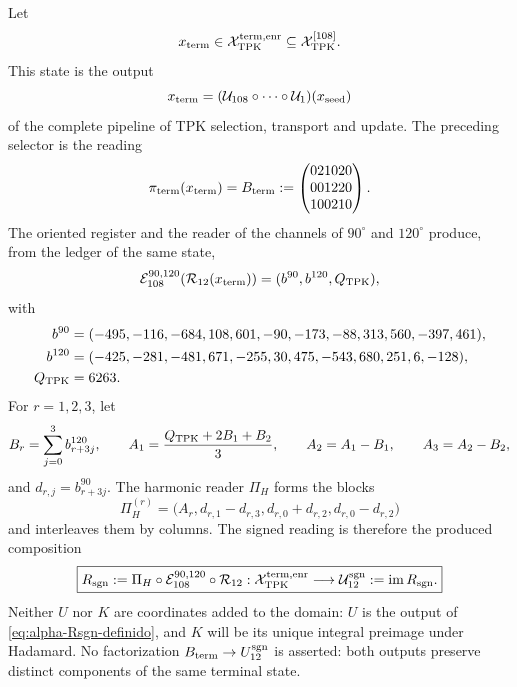 \begin{definition}
Let
\[
 x_{\rm term}\in\mathcal X_{\rm TPK}^{\rm term,enr}
 \subseteq\mathcal X_{\rm TPK}^{[108]}.
\]
This state is the output
\[
 x_{\rm term}
 =(\mathcal U_{108}\circ\cdots\circ\mathcal U_1)(x_{\rm seed})
\]
of the complete pipeline of TPK selection, transport and update.
The preceding selector is the reading
\[
 \pi_{\rm term}(x_{\rm term})
 =B_{\rm term}
 :=\begin{pmatrix}021020\\001220\\100210\end{pmatrix}.
\]
The oriented register and the reader of the channels of \(90^\circ\) and
\(120^\circ\) produce, from the ledger of the same state,
\begin{equation}\label{eq:alpha-subespacio-firmado}
 \mathcal E_{108}^{90,120}\!
 \left(\mathcal R_{12}(x_{\rm term})\right)
 =(b^{90},b^{120},Q_{\rm TPK}),
\end{equation}
with
\[
\begin{aligned}
 b^{90}={}&(-495,-116,-684,108,601,-90,
             -173,-88,313,560,-397,461),\\
 b^{120}={}&(-425,-281,-481,671,-255,30,
              475,-543,680,251,6,-128),\\
 Q_{\rm TPK}={}&6263.
\end{aligned}
\]
For \(r=1,2,3\), let
\[
 B_r=\sum_{j=0}^{3}b^{120}_{r+3j},\qquad
 A_1=\frac{Q_{\rm TPK}+2B_1+B_2}{3},\qquad
 A_2=A_1-B_1,\qquad A_3=A_2-B_2,
\]
and \(d_{r,j}=b^{90}_{r+3j}\). The harmonic reader \(\Pi_H\) forms the
blocks
\begin{equation}\label{eq:alpha-modulo-imagen-H12}
 \Pi_H^{(r)}
 =\bigl(A_r,d_{r,1}-d_{r,3},
              d_{r,0}+d_{r,2},d_{r,0}-d_{r,2}\bigr)
\end{equation}
and interleaves them by columns. The signed reading is therefore the
produced composition
\begin{equation}\label{eq:alpha-Rsgn-definido}
 \boxed{
 R_{\rm sgn}:=
 \Pi_H\circ\mathcal E_{108}^{90,120}\circ\mathcal R_{12}:
 \mathcal X_{\rm TPK}^{\rm term,enr}
 \longrightarrow
 \mathcal U_{12}^{\rm sgn}:=\operatorname{im}R_{\rm sgn}.}
\end{equation}
Neither \(U\) nor \(K\) are coordinates added to the domain: \(U\) is the output
of \eqref{eq:alpha-Rsgn-definido}, and \(K\) will be its unique integral preimage
under Hadamard.
No factorization
\(B_{\rm term}\to U_{12}^{\rm sgn}\) is asserted: both outputs preserve distinct
components of the same terminal state.


\end{definition}
